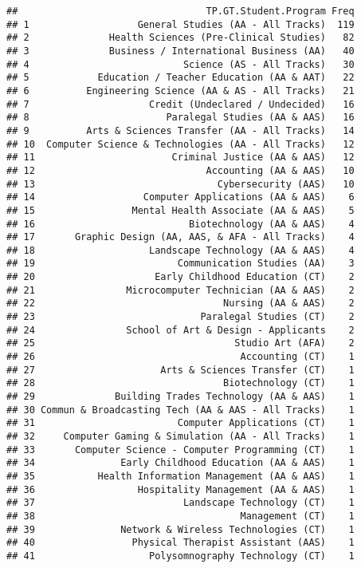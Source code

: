 \documentclass[]{article}
\begin{document}
\begin{verbatim}
##                                 TP.GT.Student.Program Freq
## 1                   General Studies (AA - All Tracks)  119
## 2              Health Sciences (Pre-Clinical Studies)   82
## 3              Business / International Business (AA)   40
## 4                           Science (AS - All Tracks)   30
## 5            Education / Teacher Education (AA & AAT)   22
## 6          Engineering Science (AA & AS - All Tracks)   21
## 7                     Credit (Undeclared / Undecided)   16
## 8                        Paralegal Studies (AA & AAS)   16
## 9          Arts & Sciences Transfer (AA - All Tracks)   14
## 10  Computer Science & Technologies (AA - All Tracks)   12
## 11                        Criminal Justice (AA & AAS)   12
## 12                              Accounting (AA & AAS)   10
## 13                                Cybersecurity (AAS)   10
## 14                   Computer Applications (AA & AAS)    6
## 15                 Mental Health Associate (AA & AAS)    5
## 16                           Biotechnology (AA & AAS)    4
## 17       Graphic Design (AA, AAS, & AFA - All Tracks)    4
## 18                    Landscape Technology (AA & AAS)    4
## 19                         Communication Studies (AA)    3
## 20                     Early Childhood Education (CT)    2
## 21                Microcomputer Technician (AA & AAS)    2
## 22                                 Nursing (AA & AAS)    2
## 23                             Paralegal Studies (CT)    2
## 24                School of Art & Design - Applicants    2
## 25                                   Studio Art (AFA)    2
## 26                                    Accounting (CT)    1
## 27                      Arts & Sciences Transfer (CT)    1
## 28                                 Biotechnology (CT)    1
## 29              Building Trades Technology (AA & AAS)    1
## 30 Commun & Broadcasting Tech (AA & AAS - All Tracks)    1
## 31                         Computer Applications (CT)    1
## 32     Computer Gaming & Simulation (AA - All Tracks)    1
## 33       Computer Science - Computer Programming (CT)    1
## 34               Early Childhood Education (AA & AAS)    1
## 35           Health Information Management (AA & AAS)    1
## 36                  Hospitality Management (AA & AAS)    1
## 37                          Landscape Technology (CT)    1
## 38                                    Management (CT)    1
## 39               Network & Wireless Technologies (CT)    1
## 40                 Physical Therapist Assistant (AAS)    1
## 41                    Polysomnography Technology (CT)    1

\end{verbatim}
\end{document}
